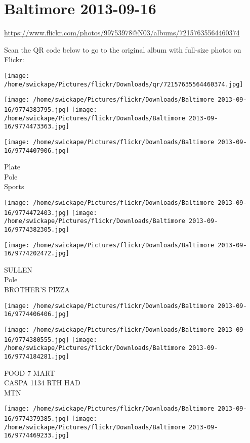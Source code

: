 \documentclass[10pt,letterpaper]{article}
\title{}
\author{}
\date{}
\begin{document}
\section*{Baltimore 2013-09-16}

\url{https://www.flickr.com/photos/99753978@N03/albums/72157635564460374}

Scan the QR code below to go to the original album with full-size photos on Flickr:

\texttt{[image: /home/swickape/Pictures/flickr/Downloads/qr/72157635564460374.jpg]}
\pagebreak

\texttt{[image: /home/swickape/Pictures/flickr/Downloads/Baltimore 2013-09-16/9774383795.jpg]}
\texttt{[image: /home/swickape/Pictures/flickr/Downloads/Baltimore 2013-09-16/9774473363.jpg]}

\vspace{0.25in}
\texttt{[image: /home/swickape/Pictures/flickr/Downloads/Baltimore 2013-09-16/9774407906.jpg]}

Plate\\
Pole\\
Sports
\pagebreak

\texttt{[image: /home/swickape/Pictures/flickr/Downloads/Baltimore 2013-09-16/9774472403.jpg]}
\texttt{[image: /home/swickape/Pictures/flickr/Downloads/Baltimore 2013-09-16/9774382305.jpg]}

\texttt{[image: /home/swickape/Pictures/flickr/Downloads/Baltimore 2013-09-16/9774202472.jpg]}

SULLEN\\
Pole\\
BROTHER'S PIZZA
\pagebreak

\texttt{[image: /home/swickape/Pictures/flickr/Downloads/Baltimore 2013-09-16/9774406406.jpg]}

\vspace{0.25in}
\texttt{[image: /home/swickape/Pictures/flickr/Downloads/Baltimore 2013-09-16/9774380555.jpg]}
\texttt{[image: /home/swickape/Pictures/flickr/Downloads/Baltimore 2013-09-16/9774184281.jpg]}

FOOD 7 MART\\
CASPA 1134 RTH HAD\\
MTN
\pagebreak

\texttt{[image: /home/swickape/Pictures/flickr/Downloads/Baltimore 2013-09-16/9774379385.jpg]}
\texttt{[image: /home/swickape/Pictures/flickr/Downloads/Baltimore 2013-09-16/9774469233.jpg]}
\end{document}
